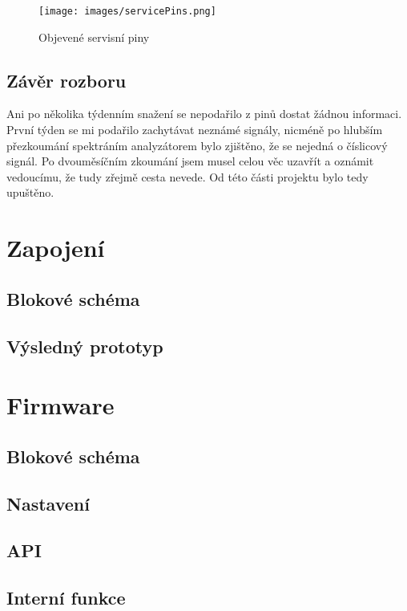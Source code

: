 \documentclass[FM,MP]{tulthesis}  %
\begin{document}
\begin{figure}[H]
\begin{center}
\texttt{[image: images/servicePins.png]}
\caption{Objevené servisní piny}
\label{image}
\end{center}
\end{figure}

\subsection{Závěr rozboru}
Ani po několika týdenním snažení se nepodařilo z pinů dostat žádnou informaci. První týden se mi podařilo zachytávat neznámé signály, nicméně po hlubším přezkoumání spektráním analyzátorem bylo zjištěno, že se nejedná o číslicový signál. Po dvouměsíčním zkoumání jsem musel celou věc uzavřít a oznámit vedoucímu, že tudy zřejmě cesta nevede. Od této části projektu bylo tedy upuštěno.

\section{Zapojení}

\subsection{Blokové schéma}

\subsection{Výsledný prototyp}

\section{Firmware}

\subsection{Blokové schéma}

\subsection{Nastavení}

\subsection{API}

\subsection{Interní funkce}
\end{document}
